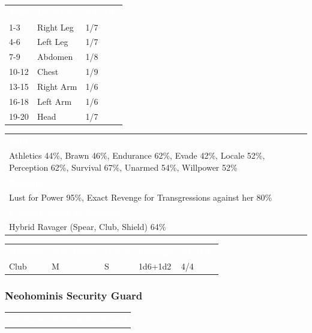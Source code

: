 \documentclass[letterpaper,serif]{rpg-module}
\begin{document}
\begin{tabularx}{\linewidth}{XXX}
\rowcolor{gray}
\textcolor{white}{\textbf{1d20}} & \textcolor{white}{\textbf{Location}} & \textcolor{white}{\textbf{AP/HP}} \\
1-3 & Right Leg & 1/7 \\
4-6 & Left Leg & 1/7 \\
7-9 & Abdomen & 1/8 \\
10-12 & Chest & 1/9 \\
13-15 & Right Arm & 1/6 \\
16-18 & Left Arm & 1/6 \\
19-20 & Head & 1/7 
\end{tabularx}

\begin{tabularx}{\linewidth}{X}
\rowcolor{gray}
\textcolor{white}{\textbf{Skills}} \\
Athletics 44\%, Brawn 46\%, Endurance 62\%, Evade 42\%, Locale 52\%, Perception 62\%, Survival 67\%, Unarmed 54\%, Willpower 52\%\\
\rowcolor{gray}
\textcolor{white}{\textbf{Passions}} \\
Lust for Power 95\%, Exact Revenge for Transgressions against her 80\% \\
\rowcolor{gray}
\textcolor{white}{\textbf{Combat Styles \& Weapons}} \\
Hybrid Ravager (Spear, Club, Shield) 64\%
\end{tabularx}

\begin{tabularx}{\linewidth}{XXXXX}
\rowcolor{gray}
\textcolor{white}{\textbf{Weapon}} & \textcolor{white}{\textbf{Size/Force}} & \textcolor{white}{\textbf{Reach}} & \textcolor{white}{\textbf{Damage}} & \textcolor{white}{\textbf{AP/HP}} \\
Club & M & S & 1d6+1d2 & 4/4
\end{tabularx}

\subsubsection{Neohominis Security Guard}

\lipsum[1]

\vspace{12pt}

\noindent\begin{tabularx}{\linewidth}{X}
\rowcolor{gray}
\textcolor{white}{\textbf{Neohominis Security Guard}}
\end{tabularx}
\end{document}
